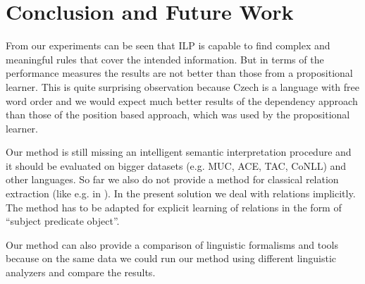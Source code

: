 \section{Conclusion and Future Work}
From our experiments can be seen that ILP is capable to find complex and meaningful rules that cover the intended information. But in terms of the performance measures the results are not better than those from a propositional learner. This is quite surprising observation because Czech is a language with free word order and we would expect much better results of the dependency approach than those of the position based approach, which was used by the propositional learner.

Our method is still missing an intelligent semantic interpretation procedure and it should be evaluated on bigger datasets (e.g. MUC, ACE, TAC, CoNLL) and other languages. So far we also do not provide a method for classical relation extraction (like e.g. in \citep{Bunescu:DependencyPaths}). In the present solution we deal with relations implicitly. The method has to be adapted for explicit learning of relations in the form of ``subject predicate object''.

Our method can also provide a comparison of linguistic formalisms and tools because on the same data we could run our method using different linguistic analyzers and compare the results.
